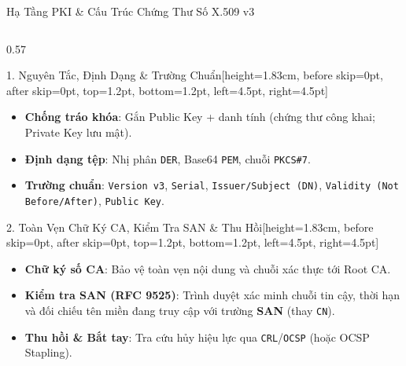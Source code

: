 \documentclass[aspectratio=169, 10pt]{beamer}
\begin{document}
\begin{frame}{Hạ Tầng PKI \& Cấu Trúc Chứng Thư Số X.509 v3}
\begin{columns}[T]
\begin{column}{0.57\textwidth}
\begin{uetcard}[height=1.12cm, before skip=0pt, after skip=0pt, valign=center, top=1.2pt, bottom=1.2pt, left=2.5pt, right=2.5pt, sharp corners, arc=0pt]
\par
			\end{uetcard}\par\nointerlineskip\vspace{0.05cm}\noindent
			\begin{accentcard}[uetblue]{1. Nguyên Tắc, Định Dạng \& Trường Chuẩn}[height=1.83cm, before skip=0pt, after skip=0pt, top=1.2pt, bottom=1.2pt, left=4.5pt, right=4.5pt]
				\raggedright
				\setlength{\leftmargini}{8pt}
				\begin{itemize}\setlength{\itemsep}{0.35pt}\setlength{\topsep}{0pt}\fontsize{5.75pt}{6.85pt}\selectfont
					\item \textbf{Chống tráo khóa}: Gắn Public Key + danh tính (chứng thư công khai; Private Key lưu mật).
					\item \textbf{Định dạng tệp}: Nhị phân \texttt{DER}, Base64 \texttt{PEM}, chuỗi \texttt{PKCS\#7}.
					\item \textbf{Trường chuẩn}: \texttt{Version v3}, \texttt{Serial}, \texttt{Issuer/Subject (DN)}, \texttt{Validity (Not Before/After)}, \texttt{Public Key}.
				\end{itemize}
			\end{accentcard}\par\nointerlineskip\vspace{0.05cm}\noindent
			\begin{accentcard}[uetblue]{2. Toàn Vẹn Chữ Ký CA, Kiểm Tra SAN \& Thu Hồi}[height=1.83cm, before skip=0pt, after skip=0pt, top=1.2pt, bottom=1.2pt, left=4.5pt, right=4.5pt]
				\raggedright
				\setlength{\leftmargini}{8pt}
				\begin{itemize}\setlength{\itemsep}{0.35pt}\setlength{\topsep}{0pt}\fontsize{5.75pt}{6.85pt}\selectfont
					\item \textbf{Chữ ký số CA}: Bảo vệ toàn vẹn nội dung và chuỗi xác thực tới Root CA.
					\item \textbf{Kiểm tra SAN (RFC 9525)}: Trình duyệt xác minh chuỗi tin cậy, thời hạn và đối chiếu tên miền đang truy cập với trường \textbf{SAN} (thay \texttt{CN}).
					\item \textbf{Thu hồi \& Bắt tay}: Tra cứu hủy hiệu lực qua \texttt{CRL}/\texttt{OCSP} (hoặc OCSP Stapling).

\end{itemize}
\end{accentcard}
\end{column}
\end{columns}
\end{frame}
\end{document}
